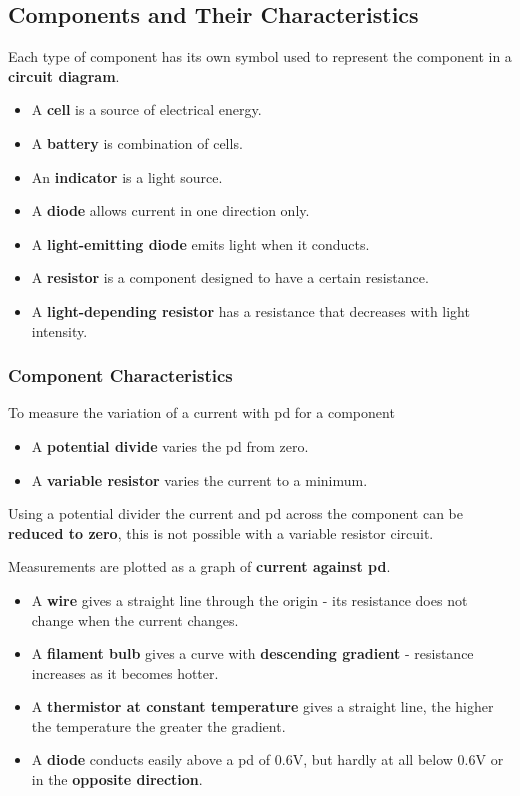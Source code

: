 \subsection{Components and Their Characteristics}

Each type of component has its own symbol used to represent the component in a \textbf{circuit diagram}.

\begin{itemize}
    \item A \textbf{cell} is a source of electrical energy.
    \item A \textbf{battery} is combination of cells.
    \item An \textbf{indicator} is a light source.
    \item A \textbf{diode} allows current in one direction only.
    \item A \textbf{light-emitting diode} emits light when it conducts.
    \item A \textbf{resistor} is a component designed to have a certain resistance.
    \item A \textbf{light-depending resistor} has a resistance that decreases with light intensity.
\end{itemize}

\subsubsection*{Component Characteristics}

To measure the variation of a current with pd for a component
\begin{itemize}
    \item A \textbf{potential divide} varies the pd from zero.
    \item A \textbf{variable resistor} varies the current to a minimum.
\end{itemize}

Using a potential divider the current and pd across the component can be \textbf{reduced to zero}, this is not possible with a variable resistor circuit.

Measurements are plotted as a graph of \textbf{current against pd}.

\begin{itemize}
    \item A \textbf{wire} gives a straight line through the origin - its resistance does not change when the current changes.
    \item A \textbf{filament bulb} gives a curve with \textbf{descending gradient} - resistance increases as it becomes hotter.
    \item A \textbf{thermistor at constant temperature} gives a straight line, the higher the temperature the greater the gradient.
    \item A \textbf{diode} conducts easily above a pd of 0.6V, but hardly at all below 0.6V or in the \textbf{opposite direction}.
\end{itemize}


